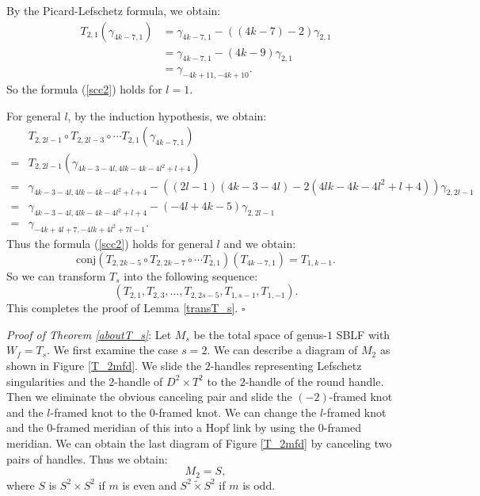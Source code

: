 \documentclass{amsart}
\theoremstyle{plain}
\theoremstyle{definition}
\begin{document}
\par

By the Picard-Lefschetz formula, we obtain: 
{\allowdisplaybreaks
\begin{align*}
T_{2,1}(\gamma_{4k-7,1}) & =\gamma_{4k-7,1}-((4k-7)-2)\gamma_{2,1} \\
& =\gamma_{4k-7,1}-(4k-9)\gamma_{2,1} \\
& =\gamma_{-4k+11,-4k+10}. 
\end{align*}
}
So the formula (\ref{scc2}) holds for $l=1$. 

\par

For general $l$, by the induction hypothesis, we obtain: 
{\allowdisplaybreaks
\begin{align*}
& T_{2,2l-1}\circ T_{2,2l-3}\circ\cdots T_{2,1}(\gamma_{4k-7,1}) \\
= & T_{2,2l-1}(\gamma_{4k-3-4l,4lk-4k-4l^2+l+4}) \\
= & \gamma_{4k-3-4l,4lk-4k-4l^2+l+4}-((2l-1)(4k-3-4l)-2(4lk-4k-4l^2+l+4))\gamma_{2,2l-1} \\
= & \gamma_{4k-3-4l,4lk-4k-4l^2+l+4}-(-4l+4k-5)\gamma_{2,2l-1} \\
= & \gamma_{-4k+4l+7,-4lk+4l^2+7l-1}. 
\end{align*}
}
Thus the formula (\ref{scc2}) holds for general $l$ and we obtain: 
\[
\text{conj}(T_{2,2k-5}\circ T_{2,2k-7}\circ\cdots T_{2,1})(T_{4k-7,1})=T_{1,k-1}. 
\]
So we can transform $T_s$ into the following sequence: 
\[
(T_{2,1},T_{2,3},\ldots,T_{2,2s-5},T_{1,s-1},T_{1,-1}). 
\]
This completes the proof of Lemma \ref{transT_s}.  \hfill $\square$

\par

{\it Proof of Theorem \ref{aboutT_s}}: Let $M_s$ be the total space of genus-$1$ SBLF with $W_f=T_s$. 
We first examine the case $s=2$. 
We can describe a diagram of $M_2$ as shown in Figure \ref{T_2mfd}. 
We slide the $2$-handles representing Lefschetz singularities and the $2$-handle of $D^2\times T^2$ to the $2$-handle of the round handle. 
Then we eliminate the obvious canceling pair and slide the $(-2)$-framed knot and the $l$-framed knot to the $0$-framed knot. 
We can change the $l$-framed knot and the $0$-framed meridian of this into a Hopf link by using the $0$-framed meridian. 
We can obtain the last diagram of Figure \ref{T_2mfd} by canceling two pairs of handles. 
Thus we obtain: 
\[
M_2=S, 
\]
where $S$ is $S^2\times S^2$ if $m$ is even and $S^2\tilde{\times}S^2$ if $m$ is odd. 
\end{document}
